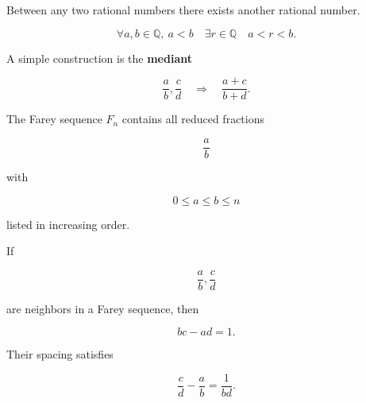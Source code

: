 \begin{exposition}
\medskip
\end{exposition}


\begin{tcolorbox}[colback=gray!6, colframe=gray!40, arc=2pt,
title={Density of $\mathbb{Q}$}]

Between any two rational numbers there exists another rational number.

\[
\forall a,b\in\mathbb{Q},\ a<b
\quad
\exists r\in\mathbb{Q}
\quad
a<r<b.
\]

A simple construction is the \textbf{mediant}

\[
\frac{a}{b},\frac{c}{d}
\quad\Rightarrow\quad
\frac{a+c}{b+d}.
\]

\end{tcolorbox}

\begin{exposition}
\medskip
\end{exposition}


\begin{tcolorbox}[colback=gray!6, colframe=gray!40, arc=2pt,
title={Farey Sequences}]

The Farey sequence $F_n$ contains all reduced fractions

\[
\frac{a}{b}
\]

with

\[
0\le a\le b\le n
\]

listed in increasing order.

If

\[
\frac{a}{b},\frac{c}{d}
\]

are neighbors in a Farey sequence, then

\[
bc-ad=1.
\]

Their spacing satisfies

\[
\frac{c}{d}-\frac{a}{b}=\frac{1}{bd}.
\]

\end{tcolorbox}

\begin{exposition}
\medskip
\end{exposition}


